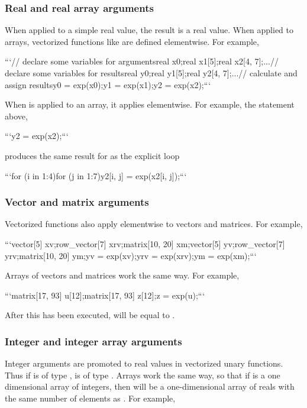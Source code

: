 \begin{description}
{\subsubsection{Real and real array arguments}


When applied to a simple real value, the result is a real value.  When applied to arrays, vectorized functions like  are defined elementwise.  For example,


```\n // declare some variables for arguments\n real x0;\n real x1[5];\n real x2[4, 7];\n ...\n // declare some variables for results\n real y0;\n real y1[5];\n real y2[4, 7];\n ...\n // calculate and assign results\n y0 = exp(x0);\n y1 = exp(x1);\n y2 = exp(x2);\n ```


When  is applied to an array, it applies elementwise.  For example, the statement above,


```\n y2 = exp(x2);\n ```


produces the same result for  as the explicit loop


```\n for (i in 1:4)\n   for (j in 1:7)\n     y2[i, j] = exp(x2[i, j]);\n ```


\subsubsection{Vector and matrix arguments}


Vectorized functions also apply elementwise to vectors and matrices. For example,


```\n vector[5] xv;\n row_vector[7] xrv;\n matrix[10, 20] xm;\n \n vector[5] yv;\n row_vector[7] yrv;\n matrix[10, 20] ym;\n \n yv = exp(xv);\n yrv = exp(xrv);\n ym = exp(xm);\n ```


Arrays of vectors and matrices work the same way.  For example,


```\n matrix[17, 93] u[12];\n \n matrix[17, 93] z[12];\n \n z = exp(u);\n ```


After this has been executed,  will be equal to .


\subsubsection{Integer and integer array arguments}


Integer arguments are promoted to real values in vectorized unary functions.  Thus if  is of type ,  is of type .  Arrays work the same way, so that if  is a one dimensional array of integers, then  will be a one-dimensional array of reals with the same number of elements as .  For example,


}
\end{description}
